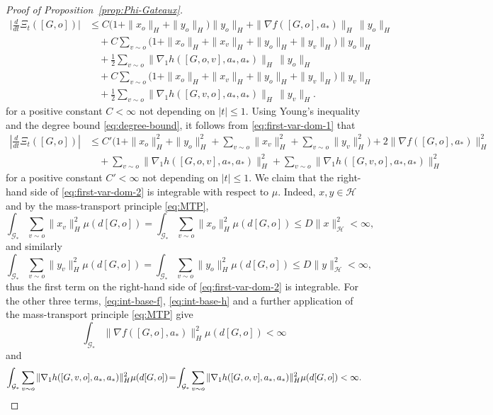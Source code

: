 \documentclass[11pt]{article}
\newcommand{\be}{\begin{equation}}
\newcommand{\ee}{\end{equation}}
\numberwithin{equation}{section}
\begin{document}
\begin{proof}[Proof of Proposition~\ref{prop:Phi-Gateaux}]
\be\begin{aligned}\label{eq:first-var-dom-1}
\bigg|\frac{d}{dt}\Xi_t([G,o])\bigg|
&\le
C\big(1+\|x_o\|_H+\|{y}_o\|_H\big)\|{y}_o\|_H
+
\|\nabla f([G,o],a_\ast)\|_H\,\|{y}_o\|_H
\\
&\quad
+
C\sum_{v\sim o}
\big(1+\|x_o\|_H+\|x_v\|_H+\|{y}_o\|_H+\|{y}_v\|_H\big)\|{y}_o\|_H
\\
&\quad
+
\frac12\sum_{v\sim o}\|\nabla_1 h([G,o,v],a_\ast,a_\ast)\|_H\,\|{y}_o\|_H
\\
&\quad
+
C\sum_{v\sim o}
\big(1+\|x_o\|_H+\|x_v\|_H+\|{y}_o\|_H+\|{y}_v\|_H\big)\|{y}_v\|_H
\\
&\quad
+
\frac12\sum_{v\sim o}\|\nabla_1 h([G,v,o],a_\ast,a_\ast)\|_H\,\|{y}_v\|_H.
\end{aligned}\ee
for a positive constant \(C<\infty\) not depending on $|t|\leq 1$. Using Young's inequality and the degree bound \eqref{eq:degree-bound}, it follows from \eqref{eq:first-var-dom-1} that
\begin{align}
\left|\frac{d}{dt}\Xi_t([G,o])\right|
&\le
C'\bigg(
1+\|x_o\|_H^2+\|{y}_o\|_H^2+\sum_{v\sim o}\|x_v\|_H^2+\sum_{v\sim o}\|{y}_v\|_H^2
\bigg) + 2\|\nabla f([G,o],a_\ast)\|_H^2\\
&\quad
+
\sum_{v\sim o}\|\nabla_1 h([G,o,v],a_\ast,a_\ast)\|_H^2
+
\sum_{v\sim o}\|\nabla_1 h([G,v,o],a_\ast,a_\ast)\|_H^2
\label{eq:first-var-dom-2}
\end{align}
for a positive constant \(C'<\infty\) not depending on $|t|\leq 1$. We claim that the right-hand side of \eqref{eq:first-var-dom-2} is integrable with respect to \(\mu\). Indeed, \(x,{y}\in\mathcal H\) and by the mass-transport principle \eqref{eq:MTP},
\[
\int_{\mathcal G_\ast}\sum_{v\sim o}\|x_v\|_H^2\mu(d[G,o])
=
\int_{\mathcal G_\ast}\sum_{v\sim o}\|x_o\|_H^2\mu(d[G,o])
\le
D\|x\|_{\mathcal H}^2<\infty,
\]
and similarly
\[
\int_{\mathcal G_\ast}\sum_{v\sim o}\|{y}_v\|_H^2\mu(d[G,o])
=
\int_{\mathcal G_\ast}\sum_{v\sim o}\|y_o\|_H^2\mu(d[G,o])
\le
D\|{y}\|_{\mathcal H}^2<\infty,
\]
thus the first term on the right-hand side of \eqref{eq:first-var-dom-2} is integrable. For the other three terms, \eqref{eq:int-base-f}, \eqref{eq:int-base-h} and a further application of the mass-transport principle \eqref{eq:MTP} give
\[
\int_{\mathcal G_\ast}\|\nabla f([G,o],a_\ast)\|_H^2\mu(d[G,o])<\infty
\]
and
\[
\int_{\mathcal G_\ast}\sum_{v\sim o}\|\nabla_1 h([G,v,o],a_\ast,a_\ast)\|_H^2\mu(d[G,o])\hspace{-0.6mm}=\hspace{-0.7mm}\int_{\mathcal G_\ast}\sum_{v\sim o}\|\nabla_1 h([G,o,v],a_\ast,a_\ast)\|_H^2\mu(d[G,o])<\infty.
\]
\end{proof}
\end{document}
